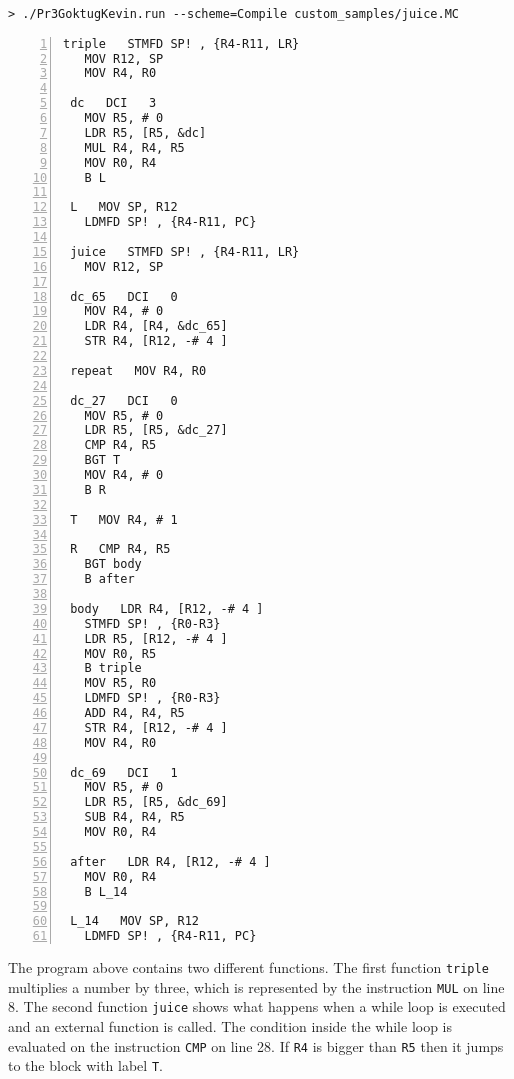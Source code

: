 \documentclass{article}
\begin{document}
\begin{verbatim}
> ./Pr3GoktugKevin.run --scheme=Compile custom_samples/juice.MC
\end{verbatim}
\begin{Verbatim}[numbers=left,xleftmargin=5mm]
 triple   STMFD SP! , {R4-R11, LR}  
   MOV R12, SP  
   MOV R4, R0  
   
 dc   DCI   3   
   MOV R5, # 0   
   LDR R5, [R5, &dc]  
   MUL R4, R4, R5  
   MOV R0, R4  
   B L  
   
 L   MOV SP, R12  
   LDMFD SP! , {R4-R11, PC}  
   
 juice   STMFD SP! , {R4-R11, LR}  
   MOV R12, SP  
   
 dc_65   DCI   0   
   MOV R4, # 0   
   LDR R4, [R4, &dc_65]  
   STR R4, [R12, -# 4 ]  
   
 repeat   MOV R4, R0  
   
 dc_27   DCI   0   
   MOV R5, # 0   
   LDR R5, [R5, &dc_27]  
   CMP R4, R5  
   BGT T  
   MOV R4, # 0   
   B R  
   
 T   MOV R4, # 1   
   
 R   CMP R4, R5  
   BGT body  
   B after  
   
 body   LDR R4, [R12, -# 4 ]  
   STMFD SP! , {R0-R3}  
   LDR R5, [R12, -# 4 ]  
   MOV R0, R5  
   B triple  
   MOV R5, R0  
   LDMFD SP! , {R0-R3}  
   ADD R4, R4, R5  
   STR R4, [R12, -# 4 ]  
   MOV R4, R0  
   
 dc_69   DCI   1   
   MOV R5, # 0   
   LDR R5, [R5, &dc_69]  
   SUB R4, R4, R5  
   MOV R0, R4  
   
 after   LDR R4, [R12, -# 4 ]  
   MOV R0, R4  
   B L_14  
   
 L_14   MOV SP, R12  
   LDMFD SP! , {R4-R11, PC} 
\end{Verbatim}

The program above contains two different functions. The first function \verb|triple| multiplies a number by three, which is represented by the instruction \verb|MUL| on line 8. The second function \verb|juice| shows what happens when a while loop is executed and an external function is called. The condition inside the while loop is evaluated on the instruction \verb|CMP| on line 28. If \verb|R4| is bigger than \verb|R5| then it jumps to the block with label \verb|T|.
\end{document}
